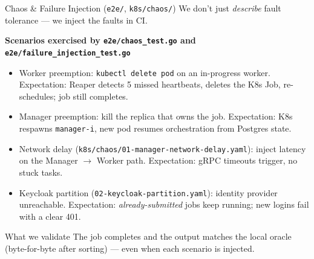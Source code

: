 \documentclass[11pt]{beamer}
\begin{document}
\begin{frame}{Chaos \& Failure Injection (\texttt{e2e/}, \texttt{k8s/chaos/})}
We don't just \emph{describe} fault tolerance --- we \alert{inject the faults} in CI.

\vspace{0.3em}
\textbf{Scenarios exercised by \texttt{e2e/chaos\_test.go} and \texttt{e2e/failure\_injection\_test.go}}
\begin{itemize}\small
  \item \alert{Worker preemption}: \texttt{kubectl delete pod} on an in-progress worker.
        Expectation: Reaper detects 5 missed heartbeats, deletes the K8s Job,
        re-schedules; job still completes.
  \item \alert{Manager preemption}: kill the replica that owns the job.
        Expectation: K8s respawns \texttt{manager-i}, new pod resumes
        orchestration from Postgres state.
  \item \alert{Network delay} (\texttt{k8s/chaos/01-manager-network-delay.yaml}):
        inject latency on the Manager $\to$ Worker path. Expectation: gRPC
        timeouts trigger, no stuck tasks.
  \item \alert{Keycloak partition} (\texttt{02-keycloak-partition.yaml}):
        identity provider unreachable. Expectation: \textit{already-submitted} jobs
        keep running; new logins fail with a clear 401.
\end{itemize}

\begin{block}{What we validate}
The job \alert{completes} and the output \alert{matches the local oracle}
(byte-for-byte after sorting) --- even when each scenario is injected.
\end{block}
\end{frame}
\end{document}
